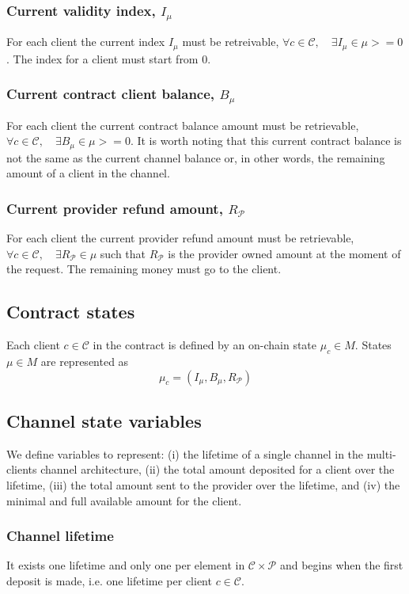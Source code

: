 \documentclass{llncs}
\begin{document}
\subsubsection{Current validity index, $I_\mu$} For each client the current index $I_\mu$ must be retreivable, $\forall c \in \mathcal{C}, \quad \exists I_\mu \in \mu >= 0$. The index for a client must start from $0$.

\subsubsection{Current contract client balance, $B_\mu$} For each client the current contract balance amount must be retrievable, $\forall c \in \mathcal{C}, \quad \exists B_\mu \in \mu >= 0$. It is worth noting that this current contract balance is not the same as the current channel balance or, in other words, the remaining amount of a client in the channel.

\subsubsection{Current provider refund amount, $R_\mathcal{P}$} For each client the current provider refund amount must be retrievable, $\forall c \in \mathcal{C}, \quad \exists R_\mathcal{P} \in \mu$ such that $R_\mathcal{P}$ is the provider owned amount at the moment of the request. The remaining money must go to the client.

\subsection{Contract states} Each client $c \in \mathcal{C}$ in the contract is defined by an on-chain state $\mu_c \in M$. States $\mu \in M$ are represented as
$$\mu_c = (I_\mu, B_\mu, R_\mathcal{P})$$

\subsection{Channel state variables} We define variables to represent: (i) the lifetime of a single channel in the multi-clients channel architecture, (ii) the total amount deposited for a client over the lifetime, (iii) the total amount sent to the provider over the lifetime, and (iv) the minimal and full available amount for the client.

\subsubsection{Channel lifetime} It exists one lifetime and only one per element in $\mathcal{C} \times \mathcal{P}$ and begins when the first deposit is made, i.e. one lifetime per client $c \in \mathcal{C}$.
\end{document}
